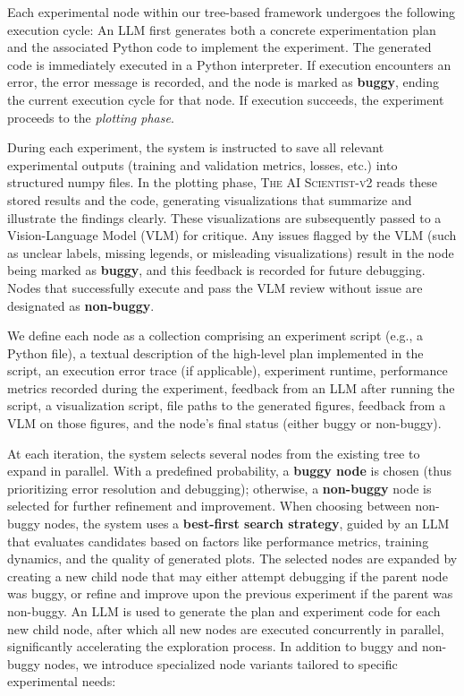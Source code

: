 \documentclass[11pt, a4paper]{include/gdm_format}
\newcommand{\ouralgo}{\textsc{The AI Scientist-v2}\xspace}
\begin{document}
Each experimental node within our tree-based framework undergoes the following execution cycle: An LLM first generates both a concrete experimentation plan and the associated Python code to implement the experiment. The generated code is immediately executed in a Python interpreter. If execution encounters an error, the error message is recorded, and the node is marked as \textbf{buggy}, ending the current execution cycle for that node. If execution succeeds, the experiment proceeds to the \emph{plotting phase}.

During each experiment, the system is instructed to save all relevant experimental outputs (training and validation metrics, losses, etc.) into structured numpy files. In the plotting phase, \ouralgo reads these stored results and the code, generating visualizations that summarize and illustrate the findings clearly. These visualizations are subsequently passed to a Vision-Language Model (VLM) for critique. Any issues flagged by the VLM (such as unclear labels, missing legends, or misleading visualizations) result in the node being marked as \textbf{buggy}, and this feedback is recorded for future debugging. Nodes that successfully execute and pass the VLM review without issue are designated as \textbf{non-buggy}.

We define each node as a collection comprising an experiment script (e.g., a Python file), a textual description of the high-level plan implemented in the script, an execution error trace (if applicable), experiment runtime, performance metrics recorded during the experiment, feedback from an LLM after running the script, a visualization script, file paths to the generated figures, feedback from a VLM on those figures, and the node's final status (either buggy or non-buggy).

At each iteration, the system selects several nodes from the existing tree to expand in parallel.
With a predefined probability, a \textbf{buggy node} is chosen (thus prioritizing error resolution and debugging); otherwise, a \textbf{non-buggy} node is selected for further refinement and improvement.
When choosing between non-buggy nodes, the system uses a \textbf{best-first search strategy}, guided by an LLM that evaluates candidates based on factors like performance metrics, training dynamics, and the quality of generated plots.
The selected nodes are expanded by creating a new child node that may either attempt debugging if the parent node was buggy, or refine and improve upon the previous experiment if the parent was non-buggy.
An LLM is used to generate the plan and experiment code for each new child node, after which all new nodes are executed concurrently in parallel, significantly accelerating the exploration process.
In addition to buggy and non-buggy nodes, we introduce specialized node variants tailored to specific experimental needs:
\end{document}
